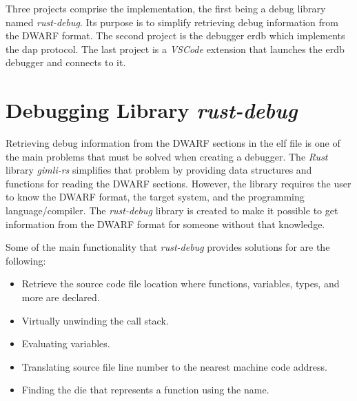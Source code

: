  


Three projects comprise the implementation, the first being a debug library named \emph{rust-debug}.
Its purpose is to simplify retrieving debug information from the \gls{DWARF} format.
The second project is the debugger \gls{erdb} which implements the \gls{dap} protocol.
The last project is a \emph{VSCode} extension that launches the \gls{erdb} debugger and connects to it.


\section{Debugging Library \emph{rust-debug}}
\label{section:rust-debug}
Retrieving debug information from the \gls{DWARF} sections in the \gls{elf} file is one of the main problems that must be solved when creating a debugger.
The \emph{Rust} library \emph{gimli-rs} simplifies that problem by providing data structures and functions for reading the \gls{DWARF} sections.
However, the library requires the user to know the \gls{DWARF} format, the target system, and the programming language/compiler.
The \emph{rust-debug} library is created to make it possible to get information from the \gls{DWARF} format for someone without that knowledge.


Some of the main functionality that \emph{rust-debug} provides solutions for are the following:

\begin{itemize}
  \item Retrieve the source code file location where functions, variables, types, and more are declared.
  \item Virtually unwinding the call stack.
  \item Evaluating variables.
  \item Translating source file line number to the nearest machine code address.
  \item Finding the \gls{die} that represents a function using the name.
\end{itemize}

